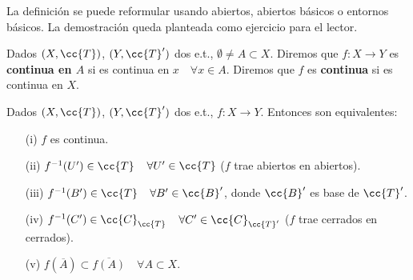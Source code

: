 \begin{observacion}
    La definición se puede reformular usando abiertos, abiertos básicos o entornos básicos. La demostración queda planteada como ejercicio para el lector. %
    \endsquare
\end{observacion}

\begin{definicion}
    Dados $(X, \cc{T})$, $(Y, \cc{T}')$ dos e.t., $\emptyset \neq A\subset X$. Diremos que $f:X\to Y$ es \textbf{continua en $A$} si es continua en $x$\ \ $\forall x \in A$. Diremos que $f$ es \textbf{continua} si es continua en $X$.
    \endsquare
\end{definicion}

\begin{prop}
    Dados $(X, \cc{T})$, $(Y, \cc{T}')$ dos e.t., $f: X \to Y$. Entonces son equivalentes:
    \begin{enumerate}
        \item[(i)] $f$ es continua.
        \item[(ii)] $f^{-1}(U')\in \cc{T}$\ \ $\forall U' \in \cc{T}$ ($f$ trae abiertos en abiertos).
        \item[(iii)] $f^{-1}(B')\in \cc{T}$\ \ $\forall B'\in \cc{B}'$, donde $\cc{B}'$ es base de $\cc{T}'$.
        \item[(iv)] $f^{-1}(C')\in \cc{C}_{\cc{T}}$\ \ $\forall C' \in \cc{C}_{\cc{T}'}$ ($f$ trae cerrados en cerrados).
        \item[(v)] $f(\overline{A})\subset \overline{f(A)}$\ \ $\forall A \subset X$.
    \end{enumerate}


\end{prop}
